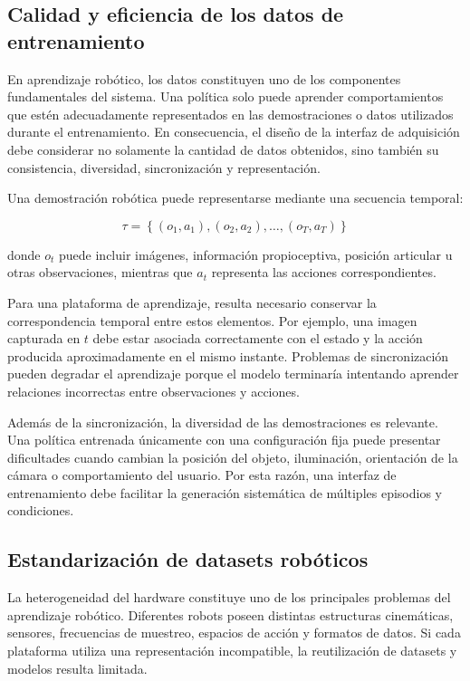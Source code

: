 \documentclass[stu,12pt,floatsintext]{apa7}
\begin{document}
\subsection{Calidad y eficiencia de los datos de entrenamiento}

En aprendizaje robótico, los datos constituyen uno de los componentes fundamentales del sistema. Una política solo puede aprender comportamientos que estén adecuadamente representados en las demostraciones o datos utilizados durante el entrenamiento. En consecuencia, el diseño de la interfaz de adquisición debe considerar no solamente la cantidad de datos obtenidos, sino también su consistencia, diversidad, sincronización y representación.

Una demostración robótica puede representarse mediante una secuencia temporal:

\begin{equation}
\tau = \left\{(o_1,a_1),(o_2,a_2),\ldots,(o_T,a_T)\right\}
\end{equation}

donde $o_t$ puede incluir imágenes, información propioceptiva, posición articular u otras observaciones, mientras que $a_t$ representa las acciones correspondientes.

Para una plataforma de aprendizaje, resulta necesario conservar la correspondencia temporal entre estos elementos. Por ejemplo, una imagen capturada en $t$ debe estar asociada correctamente con el estado y la acción producida aproximadamente en el mismo instante. Problemas de sincronización pueden degradar el aprendizaje porque el modelo terminaría intentando aprender relaciones incorrectas entre observaciones y acciones.

Además de la sincronización, la diversidad de las demostraciones es relevante. Una política entrenada únicamente con una configuración fija puede presentar dificultades cuando cambian la posición del objeto, iluminación, orientación de la cámara o comportamiento del usuario. Por esta razón, una interfaz de entrenamiento debe facilitar la generación sistemática de múltiples episodios y condiciones.

\subsection{Estandarización de datasets robóticos}

La heterogeneidad del hardware constituye uno de los principales problemas del aprendizaje robótico. Diferentes robots poseen distintas estructuras cinemáticas, sensores, frecuencias de muestreo, espacios de acción y formatos de datos. Si cada plataforma utiliza una representación incompatible, la reutilización de datasets y modelos resulta limitada.
\end{document}
